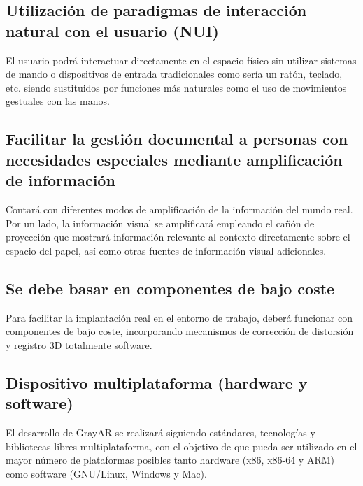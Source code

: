 \subsection{Utilización de paradigmas de interacción natural con el usuario  (NUI)}
El usuario podrá interactuar directamente en el espacio físico sin utilizar sistemas de mando o dispositivos de entrada tradicionales como sería un ratón, teclado, etc. siendo sustituidos por funciones más naturales como el uso de movimientos gestuales con las manos.

\subsection{Facilitar la gestión documental a personas con necesidades especiales mediante amplificación de información} 
Contará con diferentes modos de amplificación de la información del mundo real. Por un lado, la información visual se amplificará empleando el cañón de proyección que mostrará información relevante al contexto directamente sobre el espacio del papel, así como otras fuentes de información visual adicionales. 

\subsection{Se debe basar en componentes de bajo coste}
Para facilitar la implantación real en el entorno de trabajo, deberá funcionar con componentes de bajo coste, incorporando mecanismos de corrección de distorsión y registro 3D totalmente software.

\subsection{Dispositivo multiplataforma (hardware y software)}
El desarrollo de GrayAR se realizará siguiendo estándares, tecnologías y bibliotecas libres multiplataforma, con el objetivo de que pueda ser utilizado en el mayor número de plataformas posibles tanto hardware (x86, x86-64 y ARM) como software (GNU/Linux, Windows y Mac).


